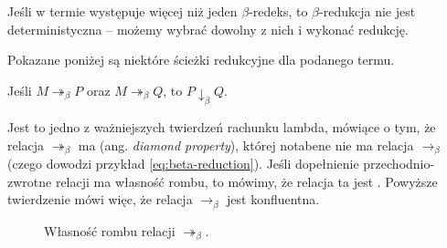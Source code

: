 \documentclass[polish,pretty]{angav}
\newcommand{\toto}{\twoheadrightarrow}
\begin{document}
Jeśli w termie występuje więcej niż jeden $\beta$-redeks, to $\beta$-redukcja nie jest deterministyczna -- możemy wybrać dowolny z nich i wykonać redukcję.

\begin{example}
    \label{eq:beta-reduction}
    Pokazane poniżej są niektóre ścieżki redukcyjne dla podanego termu.
    \begin{center}
    \end{center}
\end{example}

\begin{theorem}
    Jeśli $M \toto_\beta P$ oraz $M \toto_\beta Q$, to $P \downarrow_\beta Q$.
\end{theorem}

Jest to jedno z ważniejszych twierdzeń rachunku lambda, mówiące o tym, że relacja $\toto_\beta$ ma  (ang. \textit{diamond property}), której notabene nie ma relacja $\to_\beta$ (czego dowodzi przykład \ref{eq:beta-reduction}). Jeśli dopełnienie przechodnio-zwrotne relacji ma własność rombu, to mówimy, że relacja ta jest . Powyższe twierdzenie mówi więc, że relacja $\to_\beta$ jest konfluentna.

\begin{figure}[H]
    \centering
    \caption{Własność rombu relacji $\toto_\beta$.}
    \label{fig:church-rosser}
\end{figure}
\end{document}
